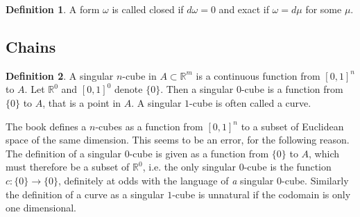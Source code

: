 \documentclass[20pt]{article}
\theoremstyle{plain}
\theoremstyle{definition}
\newtheorem{definition}{Definition}
\newcommand{\reals}{\mathbb{R}}
\begin{document}
\begin{definition}
  A form $\omega$ is called closed if $d\omega = 0$ and exact if $\omega = d\mu$ for some $\mu. $
\end{definition}






































































\subsection{Chains}

\begin{definition}
   A singular $n$-cube in $A \subset \reals^m$ is a continuous function from
   $[0,1]^n$ to $A$.  Let $\reals^0$ and $[0,1]^0$ denote $\{0\}$.
   Then a singular $0$-cube is a function from $\{0\}$ to $A$, that is a point
   in $A$.
   A singular $1$-cube is often called a curve.
\end{definition}
\color{Blue}
The book defines a $n$-cubes as a function from $[0, 1]^n$ to a subset of
Euclidean space of the same dimension.  This seems to be an error, for the following reason.
The definition of a singular $0$-cube is given as a function from $\{0\}$ to $A$, which
must therefore be a subset of $\reals^0$, i.e. the only
singular $0$-cube is the function $c: \{0\} \to \{0\}$, definitely at odds with the
language of \textit{a} singular $0$-cube.
Similarly the definition of a curve as a singular $1$-cube is unnatural if
the codomain is only one dimensional.
\color{Black}
\end{document}
